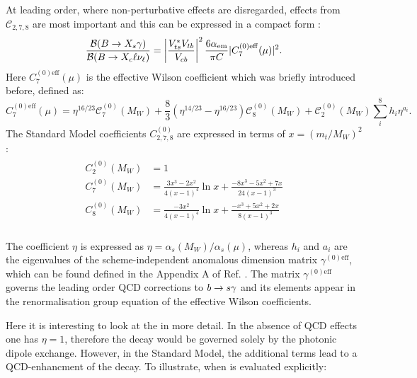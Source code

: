 At leading order, where non-perturbative effects are disregarded, effects from $\mathcal{C}_{2,7,8}$ are most important and this can be expressed in a compact form \cite{Buras:1993xp}:
\begin{equation}
    \frac{\mathcal{B}({B\rightarrow X_{s} \gamma})}{\mathcal{B}(B\rightarrow X_c\ell\nu_\ell)} = \left|\frac{V_{ts}^*V_{tb}}{V_{cb}}\right|^2\frac{6\alpha_{\mathrm{em}}}{\pi C}|C_{7}^{(0)\mathrm{eff}}(\mu)|^2.
\end{equation}
Here $C_{7}^{(0)\mathrm{eff}}(\mu)$ is the effective Wilson coefficient which was briefly introduced before, defined as:
\begin{equation}\label{eq:effective_c7}
    C_{7}^{(0)\mathrm{eff}}(\mu) = \eta^{16/23}\mathcal{C}^{(0)}_7(M_W) + \frac{8}{3} \left(\eta^{14/23}-\eta^{16/23}\right)\mathcal{C}^{(0)}_8(M_W) + \mathcal{C}^{(0)}_2(M_W) \sum_i^8h_i\eta^{a_i}.
\end{equation}
The Standard Model coefficients $C_{2,7,8}^{(0)}$ are expressed in terms of $x=(m_t/M_W)^2$:
\begin{align}
    \begin{split}
    C_2^{(0)}(M_W) &= 1\\
    C_7^{(0)}(M_W) &= \frac{3x^3-2x^2}{4(x-1)^4}\ln x + \frac{-8x^3-5x^2+7x}{24(x-1)^3}\\
    C_8^{(0)}(M_W) &= \frac{-3x^2}{4(x-1)^4}\ln x + \frac{-x^3+5x^2+2x}{8(x-1)^3}\\
    \end{split}
\end{align}

The coefficient $\eta$ is expressed as $\eta=\alpha_s(M_W)/\alpha_s(\mu)$, whereas $h_i$ and $a_i$ are the eigenvalues of the scheme-independent anomalous dimension matrix $\gamma^{(0)\mathrm{eff}}$, which can be found defined in the Appendix A of Ref. \cite{Buras:1993xp}.
The matrix $\gamma^{(0)\mathrm{eff}}$ governs the leading order QCD corrections to $b\rightarrow s\gamma$ and its elements appear in the renormalisation group equation of the effective Wilson coefficients.

Here it is interesting to look at the  in more detail. 
In the absence of QCD effects one has $\eta=1$, therefore the \BtoXsgamma decay would be governed solely by the photonic dipole exchange.
However, in the Standard Model, the additional terms lead to a QCD-enhancment of the decay.
To illustrate, when  is evaluated explicitly:


